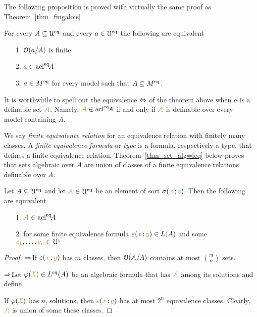The following proposition is proved with virtually the same proof as Theorem~\ref{thm_fmgalois}

\begin{theorem}\label{thm_Galois_alg=alg}
For every $A\subseteq\EuScript U^{{\rm eq}}$ and every $a\in\EuScript U^{{\rm eq}}$ the following are equivalent
\begin{itemize}
\item[1.] $\EuScript O(a/A)$ is finite
\item[2.] $a\in{\rm acl}^{{\rm eq}}\!A$
\item[3.] $a\in M^{{\rm eq}}$ for every model such that $A\subseteq M^{{\rm eq}}$.
\end{itemize}
\end{theorem}

It is worthwhile to spell out the equivalence $\Leftrightarrow$ of the theorem above when $a$ is a definable set ${\color{brown}\EuScript A}$.
Namely, ${\color{brown}\EuScript A}\in{\rm acl}^{{\rm eq}}\!A$ if and only if ${\color{brown}\EuScript A}$ is definable over every model containing $A$.

We say \emph{finite equivalence relation\/} for an equivalence relation with finitely many classes.
A \emph{finite equivalence formula\/} or \emph{type\/} is a formula, respectively a type, that defines a finite equivalence relation.
Theorem~\ref{thm_set_alg=feq} below proves that sets algebraic over $A$ are union of classes of a finite equivalence relations definable over $A$.

\begin{theorem}\label{thm_set_alg=feq}
Let $A\subseteq\EuScript U^{{\rm eq}}$ and let ${\color{brown}\EuScript A}\in\EuScript U^{{\rm eq}}$ be an element of sort $\sigma({\color{brown} x}\,;{\color{green} z})$.
Then the following are equivalent
\begin{itemize}
\item[1.] ${\color{brown}\EuScript A}\in{\rm acl}^{{\rm eq}}\!A$
\item[2.] for some finite equivalence formula $\varepsilon({\color{brown} x}\,;{\color{brown} y})\in L(A)$ and some ${\color{brown} c_1},\dots,{\color{brown} c_n}\in\EuScript U^{{\color{brown} y}}$
\end{itemize}


\end{theorem}
\begin{proof} $\Rightarrow$\quad If  $\varepsilon({\color{brown} x}\,;{\color{brown} y})$ has $m$ classes, then $\EuScript O(\EuScript A/A)$ contains at most $\displaystyle\binom{m}{n}$ sets.

$\Rightarrow$\quad Let $\varphi({\color{brown}\EuScript X})\in L^{{\rm eq}}(A)$ be an algebraic formula that has ${\color{brown}\EuScript A}$ among its solutions and define


If $\varphi({\color{brown}\EuScript X})$ has $n$, solutions, then $\varepsilon({\color{brown} x}\,;{\color{brown} y})$ has at most $2^n$ equivalence classes.
Clearly, ${\color{brown}\EuScript A}$ is union of some these classes.
\end{proof}

